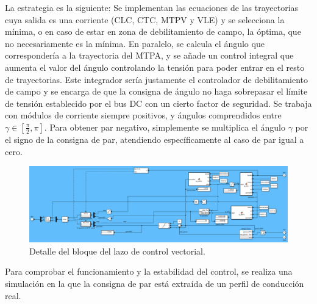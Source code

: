La estrategia es la siguiente: Se implementan las ecuaciones de las trayectorias cuya salida es una corriente (CLC, CTC, MTPV y VLE) y se selecciona la mínima, o en caso de estar en zona de debilitamiento de campo, la óptima, que no necesariamente es la mínima. En paralelo, se calcula el ángulo que correspondería a la trayectoria del MTPA, y se añade un control integral que aumenta el valor del ángulo controlando la tensión para poder entrar en el resto de trayectorias. Este integrador sería justamente el controlador de debilitamiento de campo y se encarga de que la consigna de ángulo no haga sobrepasar el límite de tensión establecido por el bus DC con un cierto factor de seguridad. Se trabaja con módulos de corriente siempre positivos, y ángulos comprendidos entre $\gamma \in [\frac{\pi}{2}, \pi]$. Para obtener par negativo, simplemente se multiplica el ángulo $\gamma$ por el signo de la consigna de par, atendiendo específicamente al caso de par igual a cero.


\begin{figure}[H]
    \centering
    \includegraphics[width=1\linewidth]{fig/EMR_control.png}
    \caption{Detalle del bloque del lazo de control vectorial.}
    
\end{figure}
\newpage
Para comprobar el funcionamiento y la estabilidad del control, se realiza una simulación en la que la consigna de par está extraída de un perfil de conducción real.

